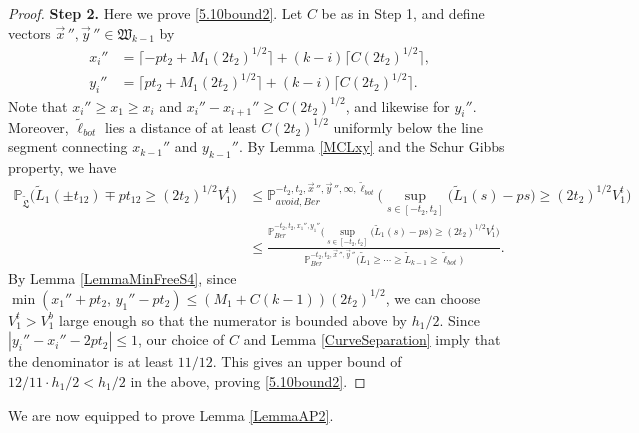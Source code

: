 \begin{proof}
	\noindent\textbf{Step 2.} Here we prove \eqref{5.10bound2}. Let $C$ be as in Step 1, and define vectors $\vec{x}\,'', \vec{y}\,''\in\mathfrak{W}_{k-1}$ by
	\begin{align*}
	x_i'' &= \lceil -pt_2 + M_1(2t_2)^{1/2}\rceil + (k-i)\lceil C(2t_2)^{1/2}\rceil,\\
	y_i'' &= \lceil pt_2 + M_1(2t_2)^{1/2}\rceil + (k-i)\lceil C(2t_2)^{1/2}\rceil.
	\end{align*}
	Note that $x_i'' \geq x_1 \geq x_i$ and $x_i''-x_{i+1}'' \geq C(2t_2)^{1/2}$, and likewise for $y_i''$. Moreover, $\tilde{\ell}_{bot}$ lies a distance of at least $C(2t_2)^{1/2}$ uniformly below the line segment connecting $x_{k-1}''$ and $y_{k-1}''$. By Lemma \ref{MCLxy} and the Schur Gibbs property, we have
	\begin{align*}
	\mathbb{P}_{\tilde{\mathfrak{L}}}\Big(\tilde{L}_1(\pm t_{12}) \mp pt_{12} \geq (2t_2)^{1/2}V_1^t\Big) &\leq \mathbb{P}^{-t_2,t_2,\vec{x}\,'',\vec{y}\,'',\infty,\tilde{\ell}_{bot}}_{avoid,Ber}\Big(\sup_{s\in[-t_2,t_2]} \big(\tilde{L}_1(s)-ps\big) \geq (2t_2)^{1/2}V_1^t\Big)\\
	&\leq \frac{\mathbb{P}^{-t_2,t_2,x_1'',y_1''}_{Ber}\Big(\sup_{s\in[-t_2,t_2]} \big(\tilde{L}_1(s)-ps\big) \geq (2t_2)^{1/2}V_1^t\Big)}{\mathbb{P}^{-t_2,t_2,\vec{x}\,'',\vec{y}\,''}_{Ber}\big(\tilde{L}_1\geq\cdots\geq\tilde{L}_{k-1}\geq\tilde{\ell}_{bot}\big)}.
	\end{align*}
	By Lemma \ref{LemmaMinFreeS4}, since $\min(x_1'' + pt_2, \, y_1'' - pt_2) \leq (M_1+C(k-1))(2t_2)^{1/2}$, we can choose $V_1^t > V_1^b$ large enough so that the numerator is bounded above by $h_1/2$. Since $|y_i'' - x_i'' - 2pt_2| \leq 1$, our choice of $C$ and Lemma \ref{CurveSeparation} imply that the denominator is at least $11/12$. This gives an upper bound of $12/11\cdot h_1/2 < h_1/2$ in the above, proving \eqref{5.10bound2}.
	
	
\end{proof}

We are now equipped to prove Lemma \ref{LemmaAP2}.


